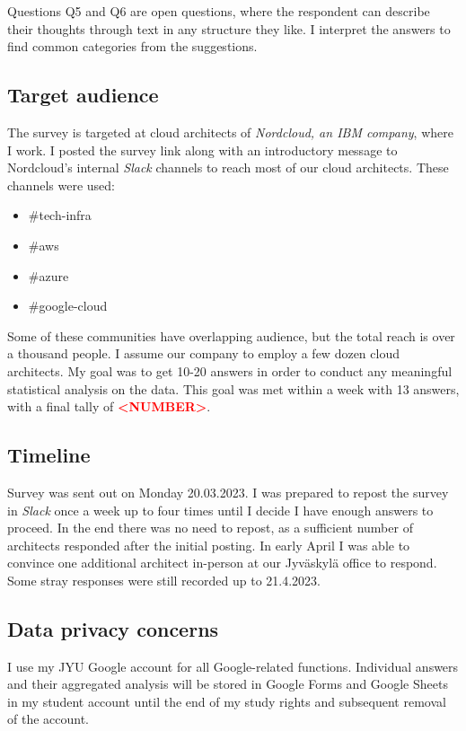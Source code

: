 \documentclass[utf8,english]{gradu3}
\newcommand{\todo}[1]{\textbf{\textcolor{red}{#1}}}
\begin{document}
Questions Q5 and Q6 are open questions, where the respondent can describe their
thoughts through text in any structure they like. I interpret the answers to
find common categories from the suggestions.

\subsection{Target audience}
The survey is targeted at cloud architects of \textit{Nordcloud, an IBM
  company}, where I work. I posted the survey link along with an introductory
message to Nordcloud's internal \textit{Slack} channels to reach most of our
cloud architects. These channels were used:
\begin{itemize}
  \item \#tech-infra
  \item \#aws
  \item \#azure
  \item \#google-cloud
\end{itemize}

Some of these communities have overlapping audience, but the total reach is over
a thousand people. I assume our company to employ a few dozen cloud architects.
My goal was to get 10-20 answers in order to conduct any meaningful statistical
analysis on the data. This goal was met within a week with 13 answers, with a
final tally of \todo{<NUMBER>}.

\subsection{Timeline}
Survey was sent out on Monday 20.03.2023. I was prepared to repost the survey
in \textit{Slack} once a week up to four times until I decide I have enough
answers to proceed. In the end there was no need to repost, as a sufficient
number of architects responded after the initial posting. In early April I was
able to convince one additional architect in-person at our Jyväskylä office to
respond. Some stray responses were still recorded up to 21.4.2023.

\subsection{Data privacy concerns}
I use my JYU Google account for all Google-related functions. Individual
answers and their aggregated analysis will be stored in Google Forms and Google
Sheets in my student account until the end of my study rights and subsequent
removal of the account.
\end{document}
